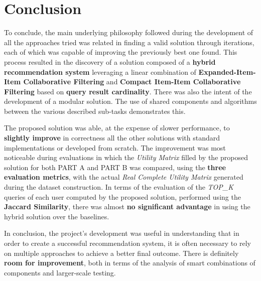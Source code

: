 \section{Conclusion}
\label{sec:conclusion}

To conclude, the main underlying philosophy followed during the development of all the approaches tried was related in finding a valid solution through iterations, each of which was capable of improving the previously best one found. This process resulted in the discovery of a solution composed of a \textbf{hybrid recommendation system} leveraging a linear combination of \textbf{Expanded-Item-Item Collaborative Filtering} and \textbf{Compact Item-Item Collaborative Filtering} based on \textbf{query result cardinality}. There was also the intent of the development of a modular solution. The use of shared components and algorithms between the various described sub-tasks demonstrates this.

The proposed solution was able, at the expense of slower performance, to \textbf{slightly improve} in correctness all the other solutions with standard implementations or developed from scratch. The improvement was most noticeable during evaluations in which the \textit{Utility Matrix} filled by the proposed solution for both PART A and PART B was compared, using the \textbf{three evaluation metrics}, with the actual \textit{Real Complete Utility Matrix} generated during the dataset construction. In terms of the evaluation of the \textit{TOP\_K} queries of each user computed by the proposed solution, performed using the \textbf{Jaccard Similarity}, there was almost \textbf{no significant advantage} in using the hybrid solution over the baselines.

In conclusion, the project's development was useful in understanding that in order to create a successful recommendation system, it is often necessary to rely on multiple approaches to achieve a better final outcome. There is definitely \textbf{room for improvement}, both in terms of the analysis of smart combinations of components and larger-scale testing.








